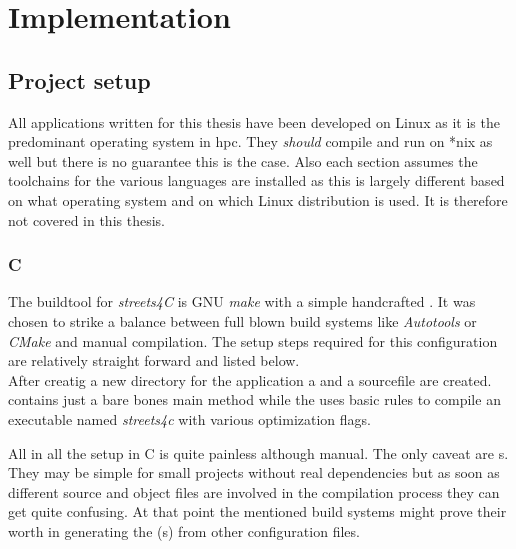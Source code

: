 \chapter{Implementation}
\label{ch:Implementation}


\setcounter{section}{-1}
\section{Project setup}
\label{sec:Implementation::Setup}

All applications written for this thesis have been developed on Linux as it is the predominant operating system in \gls{hpc}. They \textit{should} compile and run on *nix as well but there is no guarantee this is the case. Also each section assumes the toolchains for the various languages are installed as this is largely different based on what operating system and on which Linux distribution is used. It is therefore not covered in this thesis.

\subsection{C}
\label{subsec:Implementation::Setup::C}

The buildtool for \textit{streets4C} is GNU \textit{make} with a simple handcrafted . It was chosen to strike a balance between full blown build systems like \textit{Autotools} or \textit{CMake} and manual compilation. The setup steps required for this configuration are relatively straight forward and listed below.
\\


After creatig a new directory for the application a  and a sourcefile are created.  contains just a bare bones main method while the  uses basic rules to compile an executable named \textit{streets4c} with various optimization flags.

All in all the setup in C is quite painless although manual. The only caveat are s. They may be simple for small projects without real dependencies but as soon as different source and object files are involved in the compilation process they can get quite confusing. At that point the mentioned build systems might prove their worth in generating the (s) from other configuration files.

